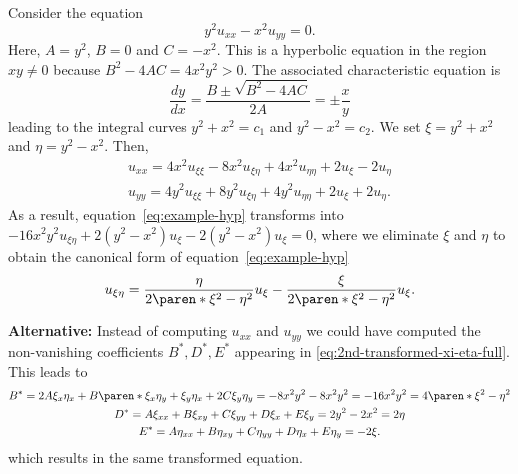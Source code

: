 \documentclass[11pt]{penrose}
\begin{document}
\begin{negg}
    Consider the equation
    \begin{equation}
        y^2 u_{xx} - x^2 u_{yy} = 0.
        \label{eq:example-hyp}
    \end{equation}
    Here, $A = y^2$, $B = 0$ and $C = -x^2$. This is a hyperbolic equation in the region $xy \neq 0$ because $B^2 - 4AC = 4x^2 y^2 > 0$. The associated characteristic equation is
    \begin{equation}
        \frac{dy}{dx} = \frac{B \pm \sqrt{B^2 - 4AC}}{2A} = \pm\frac{x}{y}
    \end{equation}
    leading to the integral curves $y^2 + x^2 = c_1$ and $y^2 - x^2 = c_2$. We set $\xi = y^2 + x^2$ and $\eta = y^2 - x^2$. Then,
    \begin{gather}
        u_{xx}
        = 4 x^2 u_{\xi\xi} - 8 x^2 u_{\xi\eta} + 4 x^2 u_{\eta\eta} + 2 u_\xi - 2 u_\eta\\
        u_{yy}
        = 4 y^2 u_{\xi\xi} + 8 y^2 u_{\xi\eta} + 4 y^2 u_{\eta\eta} + 2 u_\xi + 2 u_\eta.
    \end{gather}
    As a result, equation~\eqref{eq:example-hyp} transforms into $-16 x^2 y^2 u_{\xi\eta} + 2 (y^2 - x^2) u_{\xi} - 2 (y^2 - x^2) u_{\xi} = 0$, where we eliminate $\xi$ and $\eta$ to obtain the canonical form of equation~\eqref{eq:example-hyp}
    \begin{equation}
        u_{\xi\eta} = \frac{\eta}{2 \paren*{\xi^2 - \eta^2}} u_{\xi} - \frac{\xi}{2 \paren*{\xi^2 - \eta^2}} u_{\xi}.
    \end{equation}

    \textbf{Alternative:} Instead of computing $u_{xx}$ and $u_{yy}$ we could have computed the non-vanishing coefficients $B^{*}, D^{*}, E^{*}$ appearing in \eqref{eq:2nd-transformed-xi-eta-full}. This leads to
    \begin{gather*}
        B^{*}
        = 2A\xi_x \eta_x + B \paren*{\xi_x \eta_y + \xi_y \eta_x} + 2C \xi_y \eta_y
        = - 8 x^2 y^2 - 8 x^2 y^2
        = - 16 x^2 y^2
        = 4 \paren*{\xi^2 - \eta^2}\\
        D^{*}
        = A \xi_{xx} + B \xi_{xy} + C \xi_{yy} + D \xi_{x} + E \xi_{y}
        = 2 y^2 - 2 x^2
        = 2 \eta\\
        E^{*}
        = A \eta_{xx} + B \eta_{xy} + C \eta_{yy} + D \eta_{x} + E \eta_{y}
        = - 2 \xi.
    \end{gather*}
    which results in the same transformed equation.
\end{negg}
\end{document}
